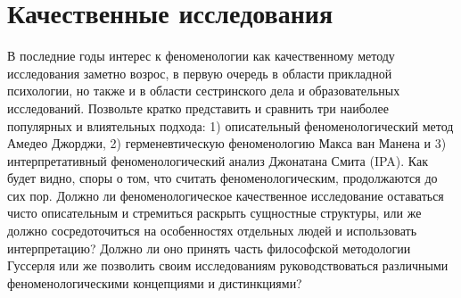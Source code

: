 \documentclass[11pt]{book}
\begin{document}
\section{Качественные исследования}

В последние годы интерес к феноменологии как качественному методу исследования заметно возрос, в первую очередь в области прикладной психологии, но также и в области сестринского дела и образовательных исследований. Позвольте кратко представить и сравнить три наиболее популярных и влиятельных подхода: 1) описательный феноменологический метод Амедео Джорджи, 2) герменевтическую феноменологию Макса ван Манена и 3) интерпретативный феноменологический анализ Джонатана Смита (IPA). Как будет видно, споры о том, что считать феноменологическим, продолжаются до сих пор. Должно ли феноменологическое качественное исследование оставаться чисто описательным и стремиться раскрыть сущностные структуры, или же должно сосредоточиться на особенностях отдельных людей и использовать интерпретацию? Должно ли оно принять часть философской методологии Гуссерля или же позволить своим исследованиям руководствоваться различными феноменологическими концепциями и дистинкциями?
\end{document}

